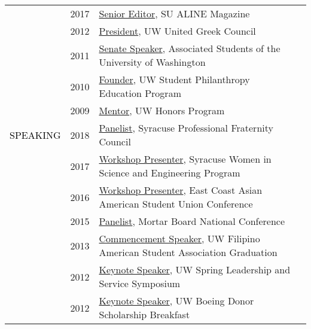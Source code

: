 \documentclass[12pt]{article}
\begin{document}
{{\begin{longtable}{Rp{1.0in}p{0.25in}p{4.75in}}
& \footnotesize{2017} & \href{https://issuu.com/alinemagazine}{{Senior Editor}}, SU ALINE Magazine \\

& \footnotesize{2012} & \href{http://www.dailyuw.com/news/article_3c781595-0b4d-52be-9a6e-b2c956ae72eb.html}{{President}}, UW United Greek Council \\

& \footnotesize{2011} & \href{http://www.dailyuw.com/news/article_da48b049-d2a0-582c-9dfb-4589755ff1e5.html}{{Senate Speaker}}, Associated Students of the University of Washington \\

& \footnotesize{2010} & \href{https://www.washington.edu/giving/get-involved/for-students/real-dawgs-give-back/}{{Founder}}, UW Student Philanthropy Education Program \\

& \footnotesize{2009} & \href{https://honors.uw.edu/community/grads/12_13/}{{Mentor}}, UW Honors Program \\

\textcolor{black}{\footnotesize{\uppercase{Speaking}}} & \footnotesize{2018} & \href{https://www.facebook.com/events/170505843576915/}{{Panelist}}, Syracuse Professional Fraternity Council \\

& \footnotesize{2017} & \href{http://www.suwise.syr.edu/}{{Workshop Presenter}}, Syracuse Women in Science and Engineering Program \\

& \footnotesize{2016} & \href{https://www.ecaasu.org/}{{Workshop Presenter}}, East Coast Asian American Student Union Conference \\

& \footnotesize{2015} & \href{http://www.mortarboard.org/conference/}{{Panelist}}, Mortar Board National Conference \\

& \footnotesize{2013} & \href{https://youtu.be/uz1tukrR-7E}{{Commencement Speaker}}, UW Filipino American Student Association Graduation \\

& \footnotesize{2012} & \href{https://youtu.be/WMPhe6H7yiM}{{Keynote Speaker}}, UW Spring Leadership and Service Symposium \\

& \footnotesize{2012} & \href{https://ischool.uw.edu/news/2016/12/bryan-dosono-informatics-student-speaks-boeing-scholarship-breakfast}{{Keynote Speaker}}, UW Boeing Donor Scholarship Breakfast \\


\end{longtable}}}
\end{document}
